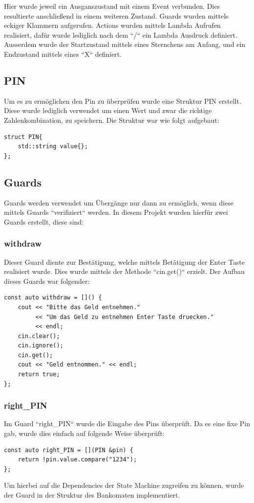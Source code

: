 \documentclass{report}
\begin{document}
Hier wurde jeweil ein Ausganszustand mit einem Event verbunden. Dies resultierte anschließend in einem weiteren Zustand. Guards wurden mittels eckiger Klammern aufgerufen. Actions wurden mittels Lambda Aufrufen realisiert, dafür wurde lediglich nach dem ``/`` ein Lambda Ausdruck definiert. Ausserdem wurde der Startzustand mittels eines Sternchens am Anfang, und ein Endzustand mittels eines ``X`` definiert.
\subsection{PIN}
Um es zu ermöglichen den Pin zu überprüfen wurde eine Struktur PIN erstellt. Diese wurde lediglich verwendet um einen Wert und zwar die richtige Zahlenkombination, zu speichern. Die Struktur war wie folgt aufgebaut:
\begin{lstlisting}
struct PIN{
    std::string value{};
};
\end{lstlisting}
\subsection{Guards}
Guards werden verwendet um Übergänge nur dann zu ermöglich, wenn diese mittels Guards ``verifiziert`` werden. In diesem Projekt wurden hierfür zwei Guards erstellt, diese sind:
\subsubsection{withdraw}
Dieser Guard diente zur Bestätigung, welche mittels Betätigung der Enter Taste realisiert wurde. Dies wurde mittels der Methode ``cin.get()`` erzielt. Der Aufbau dieses Guards war folgender:
\begin{lstlisting}
const auto withdraw = []() {
    cout << "Bitte das Geld entnehmen." 
         << "Um das Geld zu entnehmen Enter Taste druecken." 
         << endl;
    cin.clear();
    cin.ignore();
    cin.get();
    cout << "Geld entnommen." << endl;
    return true;
};
\end{lstlisting}
\subsubsection{right\_PIN}
Im Guard ``right\_PIN`` wurde die Eingabe des Pins überprüft. Da es eine fixe Pin gab, wurde dies einfach auf folgende Weise überprüft:
\begin{lstlisting}
const auto right_PIN = [](PIN &pin) {
    return !pin.value.compare("1234");
};
\end{lstlisting}
Um hierbei auf die Dependencies der State Machine zugreifen zu können, wurde der Guard in der Struktur des Bankomaten implementiert.
\end{document}
